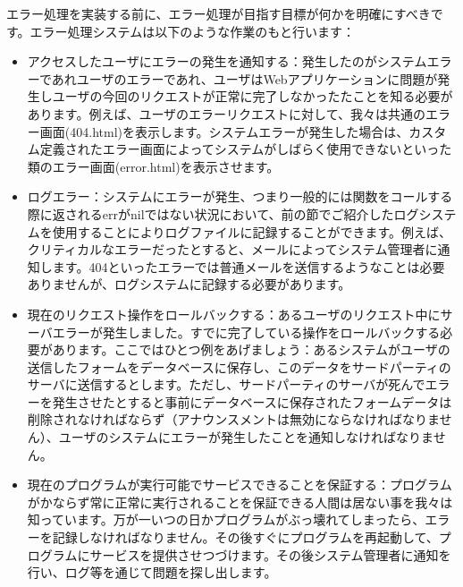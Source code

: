 エラー処理を実装する前に、エラー処理が目指す目標が何かを明確にすべきです。エラー処理システムは以下のような作業のもと行います：

\begin{itemize}
  \item アクセスしたユーザにエラーの発生を通知する：発生したのがシステムエラーであれユーザのエラーであれ、ユーザはWebアプリケーションに問題が発生しユーザの今回のリクエストが正常に完了しなかったたことを知る必要があります。例えば、ユーザのエラーリクエストに対して、我々は共通のエラー画面(404.html)を表示します。システムエラーが発生した場合は、カスタム定義されたエラー画面によってシステムがしばらく使用できないといった類のエラー画面(error.html)を表示させます。
  \item ログエラー：システムにエラーが発生、つまり一般的には関数をコールする際に返されるerrがnilではない状況において、前の節でご紹介したログシステムを使用することによりログファイルに記録することができます。例えば、クリティカルなエラーだったとすると、メールによってシステム管理者に通知します。404といったエラーでは普通メールを送信するようなことは必要ありませんが、ログシステムに記録する必要があります。
  \item 現在のリクエスト操作をロールバックする：あるユーザのリクエスト中にサーバエラーが発生しました。すでに完了している操作をロールバックする必要があります。ここではひとつ例をあげましょう：あるシステムがユーザの送信したフォームをデータベースに保存し、このデータをサードパーティのサーバに送信するとします。ただし、サードパーティのサーバが死んでエラーを発生させたとすると事前にデータベースに保存されたフォームデータは削除されなければならず（アナウンスメントは無効にならなければなりません）、ユーザのシステムにエラーが発生したことを通知しなければなりません。
  \item 現在のプログラムが実行可能でサービスできることを保証する：プログラムがかならず常に正常に実行されることを保証できる人間は居ない事を我々は知っています。万が一いつの日かプログラムがぶっ壊れてしまったら、エラーを記録しなければなりません。その後すぐにプログラムを再起動して、プログラムにサービスを提供させつづけます。その後システム管理者に通知を行い、ログ等を通じて問題を探し出します。
\end{itemize}
